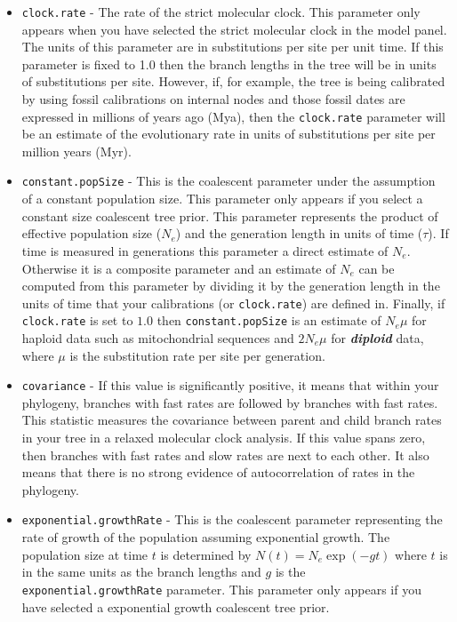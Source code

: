 \documentclass[cup7b, english]{cupbook}
\begin{document}
\begin{itemize}
\item \texttt{clock.rate} - The rate of the strict molecular clock. This parameter only appears when you have
selected the strict molecular clock in the model panel. The units of this parameter are in substitutions per site per
unit time. If this parameter is fixed to 1.0 then
the branch lengths in the tree will be in units of substitutions per site. However, if, for example, the tree is being
calibrated by using fossil calibrations on internal nodes and those fossil dates are expressed in millions of years ago
(Mya), then the \texttt{clock.rate} parameter will be an estimate of the evolutionary rate in units of substitutions
per site per million years (Myr).

\item \texttt{constant.popSize} - This is the coalescent parameter under the assumption of a constant population
size. This parameter only appears if you select a constant size coalescent tree prior. This parameter represents the
product of effective population size ($N_e$) and the generation length in units of time ($\tau$). If time is measured in
generations this parameter a direct estimate of $N_e$. Otherwise it is a composite parameter and an estimate of $N_e$
can be computed from this parameter by dividing it by the generation length in the units of time that your calibrations
(or \texttt{clock.rate}) are defined in. Finally,  if \texttt{clock.rate} is set to $1.0$ then \texttt{constant.popSize} is an
estimate of $N_e\mu$ for haploid data such as mitochondrial sequences and $2N_e\mu$ for \textbf{\textit{diploid}} data, where $\mu$ is the
substitution rate per site per generation.

\item \texttt{covariance} - If this value is significantly positive, it means that within your phylogeny,
branches with fast rates are followed by branches with fast rates. This statistic measures the covariance between parent
and child branch rates in your tree in a relaxed molecular clock analysis. If this value spans zero, then branches with
fast rates and slow rates are next to each other.  It also means that there is no strong evidence of autocorrelation
of rates in the phylogeny.

\item \texttt{exponential.growthRate} -	 This is the coalescent parameter representing the rate of growth of the
population assuming exponential growth. The population size at time $t$ is determined by $N(t)=N_e\exp(-gt)$ where $t$
is in the same units as the branch lengths and $g$ is the \texttt{exponential.growthRate} parameter. This parameter only
appears if you have selected a exponential growth coalescent tree prior.


\end{itemize}
\end{document}
